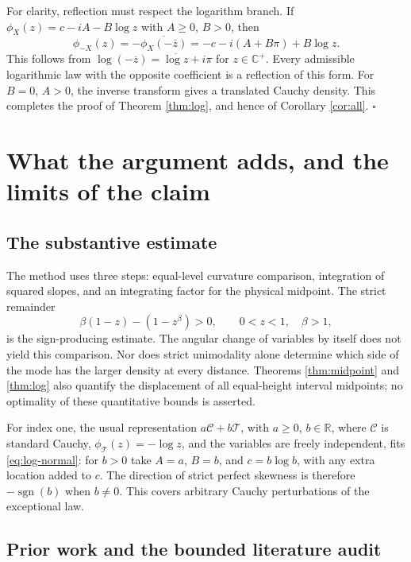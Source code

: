 \documentclass[11pt,a4paper]{article}
\theoremstyle{definition}
\theoremstyle{remark}
\numberwithin{equation}{section}
\newcommand{\R}{\mathbb{R}}
\newcommand{\Cplus}{\mathbb{C}^{+}}
\newcommand{\sign}{\operatorname{sgn}}
\begin{document}
For clarity, reflection must respect the logarithm branch. If
$\phi_X(z)=c-iA-B\log z$ with $A\ge0$, $B>0$, then
\begin{equation}\label{eq:log-reflection}
 \phi_{-X}(z)
 =-\overline{\phi_X(-\overline z)}
 =-c-i(A+B\pi)+B\log z .
\end{equation}
This follows from
$\log(-\overline z)=\overline{\log z}+i\pi$ for $z\in\Cplus$.
Every admissible logarithmic law with the opposite coefficient is
a reflection of this form. For $B=0$, $A>0$, the inverse transform
gives a translated Cauchy density. This completes the proof of
Theorem \ref{thm:log}, and hence of Corollary \ref{cor:all}.
\hfill$\square$

\section{What the argument adds, and the limits of the claim}
\label{sec:status}

\subsection{The substantive estimate}

The method uses three steps: equal-level curvature comparison,
integration of squared slopes, and an integrating factor for the
physical midpoint. The strict remainder
\[
 \beta(1-z)-(1-z^\beta)>0,\qquad 0<z<1,\quad\beta>1,
\]
is the sign-producing estimate. The angular change of variables by
itself does not yield this comparison. Nor does strict unimodality
alone determine which side of the mode has the larger density at
every distance. Theorems \ref{thm:midpoint} and \ref{thm:log}
also quantify the displacement of all equal-height interval
midpoints; no optimality of these quantitative bounds is asserted.

For index one, the usual representation
$a\mathcal C+b\mathcal T$, with $a\ge0$, $b\in\R$, where $\mathcal C$ is standard Cauchy,
$\phi_{\mathcal T}(z)=-\log z$, and the variables are freely
independent, fits \eqref{eq:log-normal}: for $b>0$ take
$A=a$, $B=b$, and $c=b\log b$, with any extra location added to $c$.
The direction of strict perfect skewness is therefore
$-\sign(b)$ when $b\ne0$. This covers arbitrary Cauchy perturbations
of the exceptional law.

\subsection{Prior work and the bounded literature audit}
\end{document}
